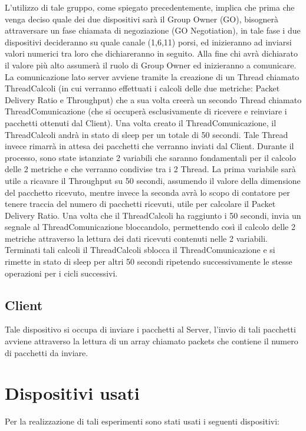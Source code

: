 L'utilizzo di tale gruppo, come spiegato precedentemente, implica che prima che venga deciso quale dei due dispositivi sarà il Group Owner (GO), bisognerà attraversare un fase chiamata di negoziazione (GO Negotiation), in tale fase i due dispositivi decideranno su quale canale (1,6,11) porsi, ed inizieranno ad inviarsi valori numerici tra loro che dichiareranno in seguito.
Alla fine chi avrà dichiarato il valore più alto assumerà il ruolo di Group Owner ed inizieranno a comunicare.
La comunicazione lato server avviene tramite la creazione di un Thread chiamato ThreadCalcoli (in cui verranno effettuati i calcoli delle due metriche: Packet Delivery Ratio e Throughput) che a sua volta creerà un secondo Thread chiamato ThreadComunicazione (che si occuperà esclusivamente di ricevere e reinviare i pacchetti ottenuti dal Client).
Una volta creato il ThreadComunicazione, il ThreadCalcoli andrà in stato di sleep per un totale di 50 secondi.
Tale Thread invece rimarrà in attesa dei pacchetti che verranno inviati dal Client.
Durante il processo, sono state istanziate 2 variabili che saranno fondamentali per il calcolo delle 2 metriche e che verranno condivise tra i 2 Thread.
La prima variabile sarà utile a ricavare il Throughput su 50 secondi, assumendo il valore della dimensione del pacchetto ricevuto, mentre invece la seconda avrà lo scopo di contatore per tenere traccia del numero di pacchetti ricevuti, utile per calcolare il Packet Delivery Ratio.
Una volta che il ThreadCalcoli ha raggiunto i 50 secondi, invia un segnale al ThreadComunicazione bloccandolo, permettendo così il calcolo delle 2 metriche attraverso la lettura dei dati ricevuti contenuti nelle 2 variabili.
Terminati tali calcoli il ThreadCalcoli sblocca il ThreadComunicazione e si rimette in stato di sleep per altri 50 secondi ripetendo successivamente le stesse operazioni per i cicli successivi.

\subsection{Client}
Tale dispositivo si occupa di inviare i pacchetti al Server, l'invio di tali pacchetti avviene attraverso la lettura di un array chiamato packets che contiene il numero di pacchetti da inviare.


\section{Dispositivi usati}
Per la realizzazione di tali esperimenti sono stati usati i seguenti dispositivi:
\newpage

